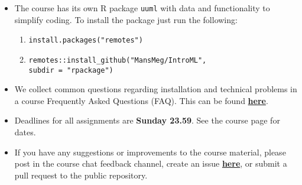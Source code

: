 \begin{itemize}
\item The course has its own R package \texttt{uuml} with data and functionality to simplify coding. To install the package just run the following:
\begin{enumerate}
\item \texttt{install.packages("remotes")}
\item \texttt{remotes::install\_github("MansMeg/IntroML", \\ subdir = "rpackage")}
\end{enumerate}


\item We collect common questions regarding installation and technical problems in a course Frequently Asked Questions (FAQ). This can be found \href{https://github.com/MansMeg/IntroML/blob/master/FAQ.md}{\textbf{here}}.

\item Deadlines for all assignments are \textbf{Sunday 23.59}. See the course page for dates.

\item If you have any suggestions or improvements to the course material, please post in the course chat feedback channel, create an issue \href{https://github.com/MansMeg/IntroML/issues}{\textbf{here}}, or submit a pull request to the public repository.

\end{itemize}

